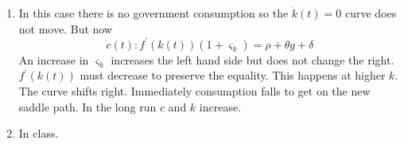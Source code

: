 \documentclass[12pt]{article}
\begin{document}
\begin{enumerate}
\begin{enumerate}
\item In this case there is no government consumption so the $\dot{k}\left(
t\right) =0$ curve does not move. But now%
\begin{equation*}
\dot{c}\left( t\right) :f^{\prime }\left( k\left( t\right) \right) \left(
1+\varsigma _{k}\right) =\rho +\theta g+\delta 
\end{equation*}%
An increase in $\varsigma _{k}$ increases the left hand side but does not
change the right. $f^{\prime }\left( k\left( t\right) \right) $ must
decrease to preserve the equality. This happens at higher $k.$ The curve
shifts right. Immediately consumption falls to get on the new saddle path.
In the long run $c$ and $k$ increase.   

\item In class.  
\end{enumerate}
\end{enumerate}
\end{document}
